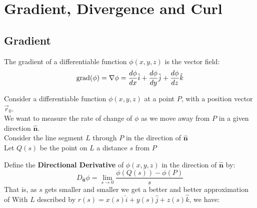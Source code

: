 \documentclass[a4paper, 10pt]{article}
\begin{document}
\pagebreak

\section{Gradient, Divergence and Curl}
\subsection{Gradient}
\begin{definitionbox}
  The gradient of a differentiable function $\phi(x,y,z)$ is the vector field:
  $$\text{grad}(\phi) =  \nabla \phi = \frac{d\phi}{dx} \hat{i} + \frac{d\phi}{dy} \hat{j} + \frac{d\phi}{dz} \hat{k}$$
\end{definitionbox}
\noindent Consider a differentiable function $\phi(x,y,z)$ at a point $P$, with a position vector $\vec{r}_0$.  \\
We want to measure the rate of change of $\phi$ as we move away from $P$ in a given direction $\hat{\mathbf{n}}$. \\
Consider the line segment $L$ through $P$ in the direction of $\hat{\mathbf{n}}$ \\
Let $Q(s)$ be the point on $L$ a distance $s$ from $P$ \\
\begin{center}
\end{center}
Define the \textbf{Directional Derivative} of $\phi(x,y,z)$ in the direction of $\hat{\mathbf{n}}$ by:
$$D_{\hat{\mathbf{n}}} \phi = \lim_{s \to 0} \frac{\phi(Q(s)) - \phi(P)}{s}$$
That is, as $s$ gets smaller and smaller we get a better and better approximation of
With $L$ described by $r(s) = x(s) \hat{i} + y(s) \hat{j} + z(s) \hat{k}$, we have:
\end{document}
